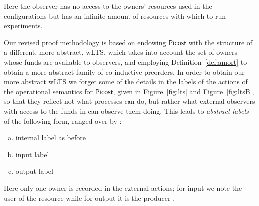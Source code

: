 \documentclass{LMCS}
\newcommand{\pfn}[1]{\mathsf{#1}}  \newcommand{\cfn}[1]{\mathsf{#1}}  \newcommand{\ownfnt}[1]{{\mathsf{#1}}}
\newcommand{\picost}{\ensuremath{\pfn{Picost}}\xspace}
\newcommand{\leaveout}[1]{ }
\begin{document}
Here the observer has no access to the owners' resources used in the configurations  but has
an infinite amount of resources with which to run experiments. 
\leaveout{
The importance of these external owners is emphasised
by the following results:
\begin{prop}\label{prop:own1}
\qquad
\begin{enumerate}[\em(a)]
\item

  Let , where  and both
   are fresh. 
Then  if and only if .

\item

Suppose , where 
again  is fresh, and 
suppose further that
. Then 
 if and only if
.
\end{enumerate}
\end{prop}
\begin{proof}
  These statements are difficult to prove directly from the definitions, but are straightforward
consequences of the full-abstraction result, Theorem~\ref{thm:fa}. 
\end{proof}
The first result states informally that there is no need to have two external owners, while the
second means that in the presence of an external owner there is no need for the observer to have
access to any other owner with indefinite funds. These, taken together with Proposition~\ref{prop:increase},
means that there is limited use in considering observers with access to owners other than a single 
external one. For this reason we are mainly interested in the behavioural preorders 
. 
}


Our revised proof methodology is based on endowing \picost with the
structure of a different, more abstract, wLTS, which takes into account 
the set of owners whose funds are available to observers, and employing
Definition~\ref{def:amort} to obtain a more abstract family of
co-inductive preorders.
In order to obtain our more abstract wLTS we forget some
of the details in the labels of the actions of the operational
semantics for \picost, given in Figure~\ref{fig:lts} and
Figure~\ref{fig:ltsB}, so that they reflect not what processes can do,
but rather what external observers with access to the funds in  can observe them doing. 
This leads
to \emph{abstract labels} of the following form, ranged over by :
\begin{enumerate}[(a)]
\item internal label  as before

\item input label  

\item output label 

\end{enumerate}
Here only one owner is recorded in the external actions; for input we note 
the user of the resource  while for output it is the producer .
\end{document}
